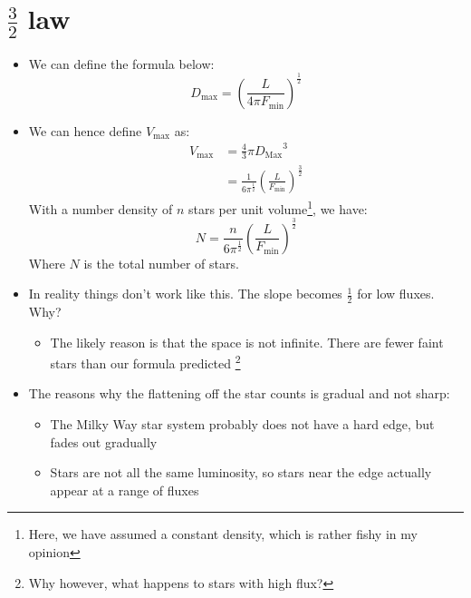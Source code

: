 \documentclass{article}
\begin{document}
\section{ $\frac{3}{2}$ law}
\begin{itemize}
\item We can define the formula below:
\begin{equation}
D_\text{max}=\left(\frac{L}{4 \pi F_\text{min}} \right) ^{\frac{1}{2}}
\end{equation}
\item We can hence define $V_\text{max}$ as:
\begin{align}
V_\text{max}&=\frac{4}{3} \pi {D_\text{Max}}^3 \\
&=\frac{1}{6 {\pi}^{\frac{1}{2}}} \left(\frac{L}{F_\text{min}}\right)^{\frac{3}{2}}
\end{align}
With a number density of $n$ stars per unit volume\footnote{Here, we have assumed a constant density, which is rather fishy in my opinion}, we have:
\begin{equation}
N=\frac{n}{6 {\pi}^{\frac{1}{2}}} \left(\frac{L}{F_\text{min}}\right)^{\frac{3}{2}}
\end{equation}
Where $N$ is the total number of stars.
\item In reality things don't work like this. The slope becomes $\frac{1}{2}$ for low fluxes. Why?
\begin{itemize}
\item The likely reason is that the space is not infinite. There are fewer faint stars than our formula predicted \footnote{Why however, what happens to stars with high flux?}
\end{itemize}
\item The reasons why the flattening off the star counts is gradual and not sharp:
\begin{itemize}
\item  The Milky Way star system probably does not have a hard edge, but fades out gradually
\item  Stars are not all the same luminosity, so stars near the edge actually appear at a range
of fluxes
\end{itemize}
\end{itemize}
\end{document}
